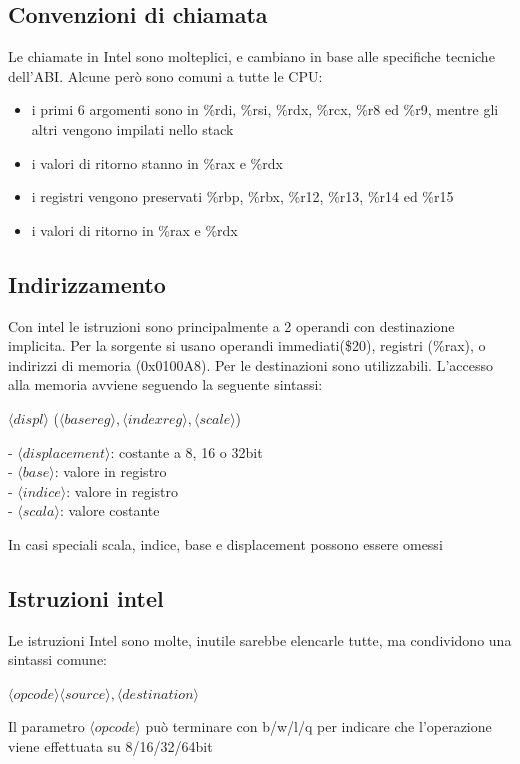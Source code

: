 \documentclass[12pt, a4paper]{article}
\begin{document}
\subsection{Convenzioni di chiamata}
Le chiamate in Intel sono molteplici, e cambiano in base alle specifiche tecniche dell'ABI. Alcune però sono 
comuni a tutte le CPU:
\begin{itemize}
  \item i primi 6 argomenti sono in \%rdi, \%rsi, \%rdx, \%rcx, \%r8 ed \%r9, mentre gli altri vengono impilati nello stack
  \item i valori di ritorno stanno in \%rax e \%rdx
  \item i registri vengono preservati \%rbp, \%rbx, \%r12, \%r13, \%r14 ed \%r15
  \item i valori di ritorno in \%rax e \%rdx
\end{itemize}


\subsection{Indirizzamento}
Con intel le istruzioni sono principalmente a 2 operandi con destinazione implicita. Per la sorgente si usano
operandi immediati(\$20), registri (\%rax), o indirizzi di memoria (0x0100A8). Per le destinazioni sono utilizzabili.
L'accesso alla memoria avviene seguendo la seguente sintassi:

$\langle displ\rangle$ ($\langle base reg\rangle, \langle index reg\rangle, \langle scale\rangle$)

 - $\langle displacement\rangle$: costante a 8, 16 o 32bit\\
 - $\langle base\rangle$: valore in registro \\
 - $\langle indice\rangle$: valore in registro \\
 - $\langle scala\rangle$: valore costante

In casi speciali scala, indice, base e displacement possono essere omessi

\subsection{Istruzioni intel}
Le istruzioni Intel sono molte, inutile sarebbe elencarle tutte, ma condividono una sintassi comune:

$\langle opcode\rangle \langle source\rangle, \langle destination\rangle$

Il parametro $\langle opcode\rangle$ può terminare con b/w/l/q per indicare che l'operazione viene 
effettuata su 8/16/32/64bit
\end{document}
